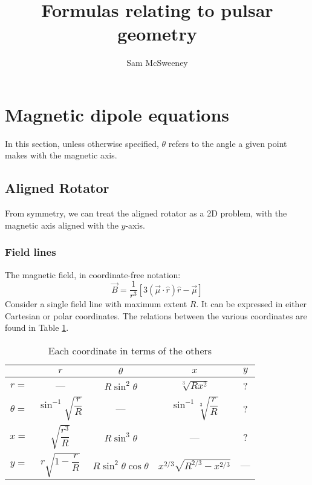 \documentclass{article}
\title{Formulas relating to pulsar geometry}
\author{Sam McSweeney}
\begin{document}
\maketitle

\tableofcontents

\section{Magnetic dipole equations}

In this section, unless otherwise specified, $\theta$ refers to the angle a given point makes with the magnetic axis.

\subsection{Aligned Rotator}

From symmetry, we can treat the aligned rotator as a 2D problem, with the magnetic axis aligned with the $y$-axis.

\subsubsection{Field lines}

The magnetic field, in coordinate-free notation:
\begin{equation}
    \vec{B} = \frac{1}{r^3}\left[3(\vec{\mu}\cdot\hat{r})\hat{r} - \vec{\mu}\right]
\end{equation}
Consider a single field line with maximum extent $R$.
It can be expressed in either Cartesian or polar coordinates.
The relations between the various coordinates are found in Table \ref{tbl:dipolar}.
\begin{table}[!ht]
    \centering
    \caption{Each coordinate in terms of the others}
    \label{tbl:dipolar}
    \begin{tabular}{c|cccc}
        & $r$ & $\theta$ & $x$ & $y$ \\[5pt]
        \hline
        $r =$      & --- & $R\sin^2\theta$ & $\sqrt[3]{Rx^2}$ & ? \\[8pt]
        $\theta =$ & $\sin^{-1}\sqrt{\dfrac{r}{R}}$ & --- & $\sin^{-1}\sqrt[3]{\dfrac{r}{R}}$ & ? \\[8pt]
        $x =$      & $\sqrt{\dfrac{r^3}{R}}$ & $R\sin^3\theta$ & --- & ? \\[8pt]
        $y =$      & $r\sqrt{1-\dfrac{r}{R}}$ & $R\sin^2\theta\cos\theta$ & $x^{2/3} \sqrt{R^{2/3} - x^{2/3}}$ & ---
    \end{tabular}
\end{table}
\end{document}
